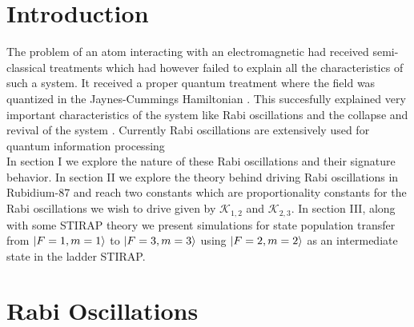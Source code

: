 \documentclass[%
 reprint,
 amsmath,amssymb,
 aps,
]{revtex4-2}
\begin{document}
\section*{Introduction}
The problem of an atom interacting with an electromagnetic had received semi-classical treatments which had however failed to explain all the characteristics of such a system. It received a proper quantum treatment where the field was quantized in the Jaynes-Cummings Hamiltonian \cite{jaynes-cumming}. This succesfully explained very important characteristics of the system like Rabi oscillations \cite{PhysRev.51.652} and the collapse and revival of the system \cite{PhysRevLett.44.1323,Collapse}. Currently Rabi oscillations are extensively used for quantum information processing \cite{10.5555/1972505}\\
In section I we explore the nature of these Rabi oscillations and their signature behavior. In section II we explore the theory behind driving Rabi oscillations in Rubidium-87 and reach two constants which are proportionality constants for the Rabi oscillations we wish to drive given by $\mathcal{K}_{1,2}$ and $\mathcal{K}_{2,3}$. In section III, along with some STIRAP theory we present simulations for state population transfer from $\ket{F=1,m=1}$ to $\ket{F=3,m=3}$ using $\ket{F=2,m=2}$ as an intermediate state in the ladder STIRAP.

\section{Rabi Oscillations}
\end{document}
